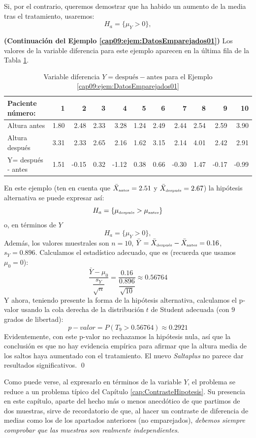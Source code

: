 Si, por el contrario, queremos demostrar que ha habido un aumento de la media tras el tratamiento, usaremos:
\[H_a=\{\mu_Y > 0\},\]
\begin{ejemplo}
{\bf (Continuación del Ejemplo \ref{cap09:ejem:DatosEmparejados01})}
\label{cap09:ejem:DatosEmparejados02}
Los valores de la variable diferencia para este ejemplo aparecen en la última fila de la Tabla \ref{cap09:tabla:EjemploContrasteDatosEmparejados02}.
\begin{table}[htb]
{\scriptsize
    \begin{center}
    \begin{tabular}{|l|r|r|r|r|r|r|r|r|r|r|}
    \hline
    Paciente número:&1&2& 3 & 4 & 5 & 6 & 7 & 8 & 9 & 10 \\
    \hline
    Altura antes& 1.80 & 2.48 & 2.33 & 3.28 & 1.24 & 2.49 & 2.44 & 2.54 & 2.59 & 3.90\\
    \hline
    Altura después & 3.31 & 2.33 & 2.65 & 2.16 & 1.62 & 3.15 & 2.14 & 4.01 & 2.42 & 2.91  \\
    \hline
    Y= después - antes & 1.51& -0.15& 0.32& -1.12& 0.38& 0.66& -0.30& 1.47& -0.17& -0.99  \\
    \hline
    \end{tabular}
    \end{center}
}
\caption{Variable diferencia $Y=\mbox{después}-\mbox{antes}$ para el Ejemplo \ref{cap09:ejem:DatosEmparejados01}}
\label{cap09:tabla:EjemploContrasteDatosEmparejados02}
\end{table}

\noindent
En este ejemplo (ten en cuenta que  $\bar X_{\mbox{\tiny antes}}=2.51$ y $\bar X_{\mbox{\tiny después}}=2.67$) la hipótesis alternativa se puede expresar así:
\[H_a=\{\mu_{\mbox{\tiny después}}>\mu_{\mbox{\tiny antes}}\}\]
o, en términos de $Y$
\[H_a=\{\mu_Y > 0\},\]
Además, los valores muestrales son $n=10$, $\bar Y=\bar X_{\mbox{\tiny después}}-\bar X_{\mbox{\tiny antes}}=0.16$, $s_Y=0.896$. Calculamos el estadístico adecuado, que es (recuerda que usamos $\mu_0=0$):
\[\dfrac{\bar Y-\mu_0}{\dfrac{s_Y}{\sqrt{n}}}=\dfrac{0.16}{\dfrac{0.896}{\sqrt{10}}}\approx 0.56764\]
Y ahora, teniendo presente la forma de la hipótesis alternativa, calculamos el p-valor usando la cola derecha de la distribución $t$ de Student adecuada (con $9$ grados de libertad):
\[
p-valor=P(T_9>0.56764)\approx 0.2921
\]
Evidentemente, con este p-valor no rechazamos la hipótesis nula, así que la conclusión es que no hay evidencia empírica para afirmar que la altura media de los saltos haya aumentado con el tratamiento. El nuevo {\em Saltaplus} no parece dar resultados significativos.
\qed
\end{ejemplo}
Como puede verse, al expresarlo en términos de la  variable $Y$, el problema se reduce a un problema típico del Capítulo \ref{cap:ContrasteHipotesis}. Su presencia en este capítulo, aparte del hecho más o menos anecdótico de que partimos de dos muestras, sirve de recordatorio de que, al hacer un contraste de diferencia de medias como los de los apartados anteriores (no emparejados), {\em  debemos siempre comprobar que las muestras son realmente independientes}.

